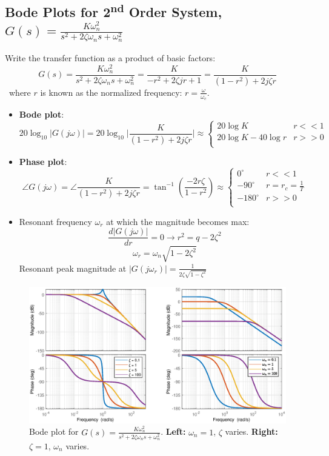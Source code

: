 \subsection{Bode Plots for 2\textsuperscript{nd} Order System, $G(s) = \frac{K\omega_{n}^{2}}{s^{2}+2\zeta\omega_{n}s+\omega_{n}^{2}}$}
Write the transfer function as a product of basic factors:
\[G(s) = \frac{K\omega_{n}^{2}}{s^{2}+2\zeta\omega_{n}s+\omega_{n}^{2}}=\frac{K}{-r^{2}+2\zeta jr +1}=\frac{K}{(1-r^{2})+2j\zeta r}\]
\ where $r$ is known as the normalized frequency: $r = \frac{\omega}{\omega_{c}}$.
\begin{itemize}
\item \textbf{Bode plot}:
\[20\log_{10}\lvert G(j\omega) \rvert  =  20\log_{10} \bigg\lvert \frac{K}{(1-r^{2})+2j\zeta r} \bigg\rvert \approx \begin{cases}
20\log K & r<<1\\
20\log K - 40\log r & r>>0\\
\end{cases}\]

\item \textbf{Phase plot}:
\[\angle G(j\omega) = \angle \frac{K}{(1-r^{2})+2j\zeta r} =  \tan^{-1}(\frac{-2r\zeta}{1-r^{2}}) \approx \begin{cases}
0^{\circ} & r<<1\\
-90^{\circ}& r=r_{c}=\frac{1}{T}\\
-180^{\circ}& r>>0\\
\end{cases}\]
\item Resonant frequency $\omega_{r}$ at which the magnitude becomes max:
\[\frac{d\lvert G(j\omega) \rvert}{dr}=0 \to r^{2} = q-2\zeta^{2}\]
\[\omega_{r} = \omega_{n}\sqrt{1-2\zeta^{2}}\]
Resonant peak magnitude at $\lvert G(j\omega_{r}) \rvert =\frac{1}{2\zeta\sqrt{1-\zeta^{2}}} $
\end{itemize}
\vspace{-1cm}
\begin{figure}[H]
    \centering
    \includegraphics[width=\textwidth]{images/bode1.eps}
    \caption{Bode plot for $G(s) = \frac{K\omega_{n}^{2}}{s^{2}+2\zeta\omega_{n}s+\omega_{n}^{2}}$. \textbf{Left:} $\omega_{n}=1$, $\zeta$ varies. \textbf{Right:} $\zeta=1$, $\omega_{n}$ varies.}
\end{figure}

